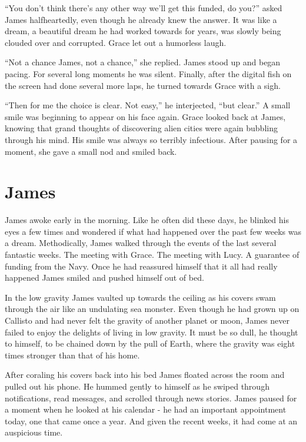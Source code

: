 \documentclass[openany, 12pt]{book} %
\begin{document}
``You don't think there's any other way we'll get this funded, do you?'' asked James halfheartedly, even though he already knew the answer. It was like a dream, a beautiful dream he had worked towards for years, was slowly being clouded over and corrupted. Grace let out a humorless laugh.

``Not a chance James, not a chance,'' she replied. James stood up and began pacing. For several long moments he was silent. Finally, after the digital fish on the screen had done several more laps, he turned towards Grace with a sigh.

``Then for me the choice is clear. Not easy,'' he interjected, ``but clear.'' A small smile was beginning to appear on his face again. Grace looked back at James, knowing that grand thoughts of discovering alien cities were again bubbling through his mind. His smile was always so terribly infectious. After pausing for a moment, she gave a small nod and smiled back.

\chapter{James}
James awoke early in the morning. Like he often did these days, he blinked his eyes a few times and wondered if what had happened over the past few weeks was a dream. Methodically, James walked through the events of the last several fantastic weeks. The meeting with Grace. The meeting with Lucy. A guarantee of funding from the Navy. Once he had reassured himself that it all had really happened James smiled and pushed himself out of bed.

In the low gravity James vaulted up towards the ceiling as his covers swam through the air like an undulating sea monster. Even though he had grown up on Callisto and had never felt the gravity of another planet or moon, James never failed to enjoy the delights of living in low gravity. It must be so dull, he thought to himself, to be chained down by the pull of Earth, where the gravity was eight times stronger than that of his home.

After coraling his covers back into his bed James floated across the room and pulled out his phone. He hummed gently to himself as he swiped through notifications, read messages, and scrolled through news stories. James paused for a moment when he looked at his calendar - he had an important appointment today, one that came once a year. And given the recent weeks, it had come at an auspicious time.
\end{document}

